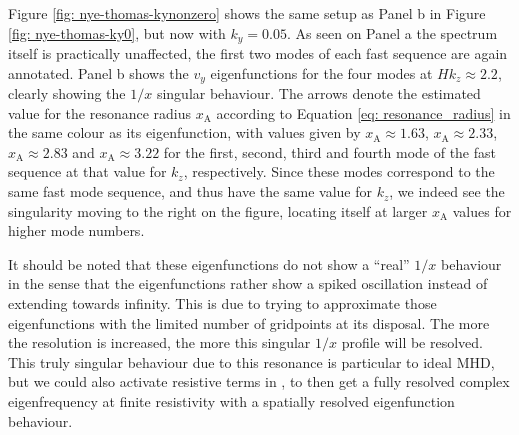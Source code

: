 Figure \ref{fig: nye-thomas-kynonzero} shows the same setup as Panel b in Figure \ref{fig: nye-thomas-ky0}, but now with $k_y = 0.05$. As seen on Panel a the spectrum itself is practically unaffected, the first two modes of each fast sequence are again annotated. Panel b shows the $v_y$ eigenfunctions for the four modes at $H k_z \approx 2.2$, clearly showing the $1/x$ singular behaviour. The arrows denote the estimated value for the resonance radius $x_\text{A}$ according to Equation \eqref{eq: resonance_radius} in the same colour as its eigenfunction, with values given by $x_\text{A} \approx 1.63$, $x_\text{A} \approx 2.33$, $x_\text{A} \approx 2.83$ and $x_\text{A} \approx 3.22$ for the first, second, third and fourth mode of the fast sequence at that value for $k_z$, respectively. Since these modes correspond to the same fast mode sequence, and thus have the same value for $k_z$, we indeed see the singularity moving to the right on the figure, locating itself at larger $x_\text{A}$ values for higher mode numbers.

It should be noted that these eigenfunctions do not show a ``real'' $1/x$ behaviour in the sense that the eigenfunctions rather show a spiked oscillation instead of extending towards infinity. This is due to {\legolas} trying to approximate those eigenfunctions with the limited number of gridpoints at its disposal. The more the resolution is increased, the more this singular $1/x$ profile will be resolved. This truly singular behaviour due to this resonance is particular to ideal MHD, but we could also activate resistive terms in {\legolas}, to then get a fully resolved complex eigenfrequency at finite resistivity with a spatially resolved eigenfunction behaviour.


